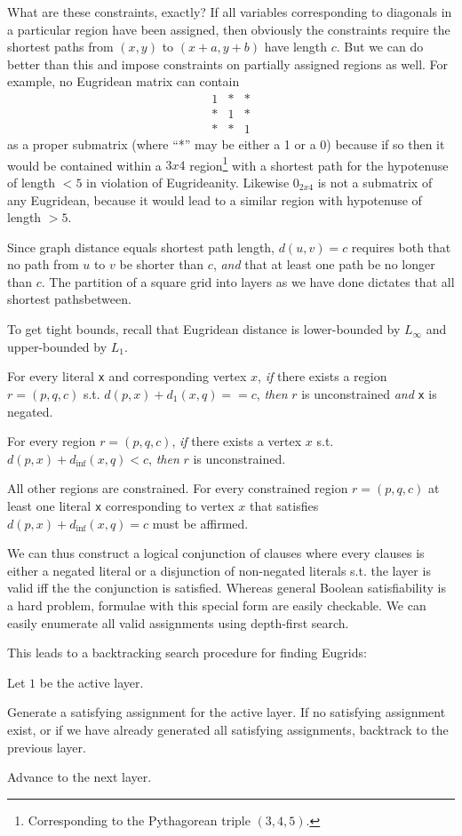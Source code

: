 \documentclass{article}
\begin{document}
What are these constraints, exactly? If all variables corresponding to diagonals in a
particular region have been assigned, then obviously the constraints require the shortest
paths from $(x, y)$ to $(x+a, y+b)$ have length $c$. But we can do better than this and
impose constraints on partially assigned regions as well. For example, no Eugridean matrix
can contain
\begin{equation*}
\begin{matrix}
  1 & * & * \\
  * & 1 & * \\
  * & * & 1
\end{matrix}
\end{equation*}
as a proper submatrix (where ``*'' may be either a 1 or a 0) because if so then it would be
contained within a $3x4$ region\footnote{Corresponding to the Pythagorean triple $(3, 4,
5)$.} with a shortest path for the hypotenuse of length $< 5$ in violation of Eugrideanity.
Likewise $0_{2 x 4}$ is not a submatrix of any Eugridean, because it would lead to a similar
region with hypotenuse of length $> 5$.

Since graph distance equals shortest path length, $d(u, v) = c$ requires both that no path
from $u$ to $v$ be shorter than $c$, \emph{and} that at least one path be no longer than $c$.
The partition of a square grid into layers as we have done dictates that all shortest pathsbetween.

To get tight bounds, recall that Eugridean distance is lower-bounded by $L_\infty$ and
upper-bounded by $L_1$.

For every literal \verb|x| and corresponding vertex $x$, \emph{if} there exists a region
$r = (p, q, c)$ s.t. $d(p, x) + d_1(x, q) == c$, \emph{then} $r$ is unconstrained \emph{and}
\verb|x| is negated.

For every region $r = (p, q, c)$, \emph{if} there exists a vertex $x$ s.t.
$d(p, x) + d_{\inf}(x, q) < c$, \emph{then} $r$ is unconstrained.

All other regions are constrained. For every constrained region $r = (p, q, c)$ at least one
literal \verb|x| corresponding to vertex $x$ that satisfies $d(p, x) + d_{\inf}(x, q) = c$
must be affirmed.

We can thus construct a logical conjunction of clauses where every clauses is either a
negated literal or a disjunction of non-negated literals s.t. the layer is valid iff the the
conjunction is satisfied. Whereas general Boolean satisfiability is a hard problem, formulae
with this special form are easily checkable. We can easily enumerate all valid assignments
using depth-first search.

This leads to a backtracking search procedure for finding Eugrids:

Let $1$ be the active layer.

Generate a satisfying assignment for the active layer. If no satisfying assignment exist, or
if we have already generated all satisfying assignments, backtrack to the previous layer.

Advance to the next layer.
\end{document}
